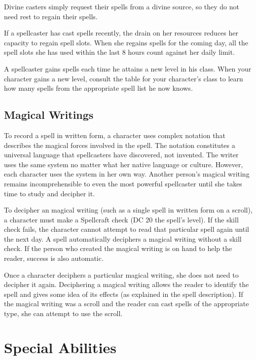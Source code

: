 Divine casters simply request their spells from a divine source, so they do not need rest to regain their spells.

 If a spellcaster has cast spells recently, the drain on her resources reduces her capacity to regain spell slots. When she regains spells for the coming day, all the spell slots she has used within the last 8 hours count against her daily limit.

 A spellcaster gains spells each time he attains a new level in his class. When your character gains a new level, consult the table for your character's class to learn how many spells from the appropriate spell list he now knows.

\subsection{Magical Writings}
To record a spell in written form, a character uses complex notation that describes the magical forces involved in the spell. The notation constitutes a universal language that spellcasters have discovered, not invented. The writer uses the same system no matter what her native language or culture. However, each character uses the system in her own way. Another person's magical writing remains incomprehensible to even the most powerful spellcaster until she takes time to study and decipher it.

To decipher an magical writing (such as a single spell in written form on a scroll), a character must make a Spellcraft check (DC 20 \add the spell's level). If the skill check fails, the character cannot attempt to read that particular spell again until the next day. A  spell automatically deciphers a magical writing without a skill check. If the person who created the magical writing is on hand to help the reader, success is also automatic.

Once a character deciphers a particular magical writing, she does not need to decipher it again. Deciphering a magical writing allows the reader to identify the spell and gives some idea of its effects (as explained in the spell description). If the magical writing was a scroll and the reader can cast spells of the appropriate type, she can attempt to use
the scroll.

\section{Special Abilities }

